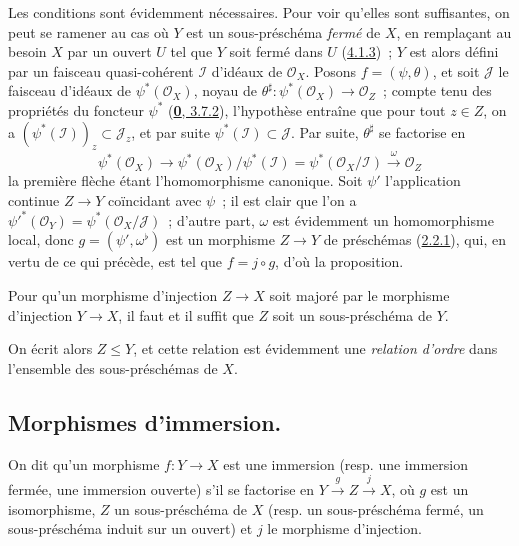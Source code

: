 Les conditions sont évidemment nécessaires. Pour voir qu'elles sont
suffisantes, on peut se ramener au cas où $Y$ est un sous-préschéma
\emph{fermé} de $X$, en remplaçant au besoin $X$ par un ouvert $U$ tel que
$Y$ soit fermé dans $U$ (\hyperref[I.4.1.3-fr]{4.1.3})~; $Y$ est alors défini
par un faisceau quasi-cohérent $\mathscr{I}$ d'idéaux de $\mathscr{O}_X$.
Posons $f=(\psi,\theta)$, et soit $\mathscr{J}$ le faisceau d'idéaux de
$\psi^*(\mathscr{O}_X)$, noyau de
$\theta^\sharp:\psi^*(\mathscr{O}_X)\to\mathscr{O}_Z$~; compte tenu des
propriétés du foncteur $\psi^*$ (\hyperref[0.3.7.2-fr]{\textbf{0}, 3.7.2}),
l'hypothèse entraîne que pour tout $z\in Z$, on a
$(\psi^*(\mathscr{I}))_z\subset\mathscr{J}_z$, et par suite
$\psi^*(\mathscr{I})\subset\mathscr{J}$. Par suite, $\theta^\sharp$ se
factorise en
\[
  \psi^*(\mathscr{O}_X)\longrightarrow
  \psi^*(\mathscr{O}_X)/\psi^*(\mathscr{I})
  =\psi^*(\mathscr{O}_X/\mathscr{I})
  \xrightarrow{\omega}\mathscr{O}_Z
\]
la première flèche étant l'homomorphisme canonique. Soit $\psi'$ l'application
continue $Z\to Y$ coïncidant avec $\psi$~; il est clair que l'on a
${\psi'}^*(\mathscr{O}_Y)=\psi^*(\mathscr{O}_X/\mathscr{J})$~; d'autre part,
$\omega$ est évidemment un homomorphisme local, donc
$g=(\psi',\omega^\flat)$ est un morphisme $Z\to Y$
de préschémas (\hyperref[I.2.2.1-fr]{2.2.1}), qui, en vertu de ce qui précède,
est tel que $f=j\circ g$, d'où la proposition.

\begin{corollary}[4.1.10]
\label{I.4.1.10-fr}
Pour qu'un morphisme d'injection $Z\to X$ soit majoré par le morphisme
d'injection $Y\to X$, il faut et il suffit que $Z$ soit un sous-préschéma de
$Y$.
\end{corollary}

On écrit alors $Z\leq Y$, et cette relation est évidemment une
\emph{relation d'ordre} dans l'ensemble des sous-préschémas de $X$.

\subsection{Morphismes d'immersion.}
\label{subsection:I.4.2-fr}

\begin{definition}[4.2.1]
\label{I.4.2.1-fr}
On dit qu'un morphisme $f:Y\to X$ est une immersion (\textup{resp.} une
immersion fermée, une immersion ouverte) s'il se factorise en
$Y\xrightarrow{g}Z\xrightarrow{j}X$, où $g$ est un isomorphisme, $Z$ un
sous-préschéma de $X$ (\textup{resp.} un sous-préschéma fermé, un sous-préschéma induit
sur un ouvert) et $j$ le morphisme d'injection.
\end{definition}

